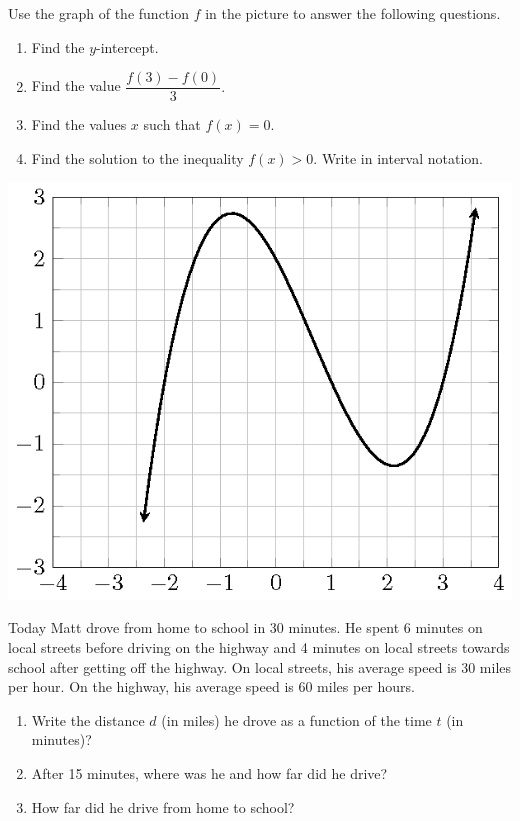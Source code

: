 \documentclass[en,11pt]{elegantbook}
\let\BeginKnitrBlock\begin \let\EndKnitrBlock\end
\begin{document}
\BeginKnitrBlock{exercise}
\protect\hypertarget{exr:unnamed-chunk-230}{}{\label{exr:unnamed-chunk-230} }
Use the graph of the function \(f\) in the picture to answer the following questions.

\begin{enumerate}
\def\labelenumi{\arabic{enumi}.}

\item
  Find the \(y\)-intercept.
\item
  Find the value \(\dfrac{f(3)-f(0)}{3}.\)
\item
  Find the values \(x\) such that \(f(x)=0\).
\item
  Find the solution to the inequality \(f(x)>0\). Write in interval notation.
\end{enumerate}
\EndKnitrBlock{exercise}

\begin{center}\includegraphics[width=0.5\linewidth]{figs/function-exercise-cubic} \end{center}

\BeginKnitrBlock{exercise}
\protect\hypertarget{exr:unnamed-chunk-232}{}{\label{exr:unnamed-chunk-232} }
Today Matt drove from home to school in 30 minutes. He spent 6 minutes on local streets before driving on the highway and 4 minutes on local streets towards school after getting off the highway. On local streets, his average speed is 30 miles per hour. On the highway, his average speed is 60 miles per hours.

\begin{enumerate}
\def\labelenumi{\arabic{enumi}.}

\item
  Write the distance \(d\) (in miles) he drove as a function of the time \(t\) (in minutes)?
\item
  After 15 minutes, where was he and how far did he drive?
\item
  How far did he drive from home to school?
\end{enumerate}
\EndKnitrBlock{exercise}
\end{document}
